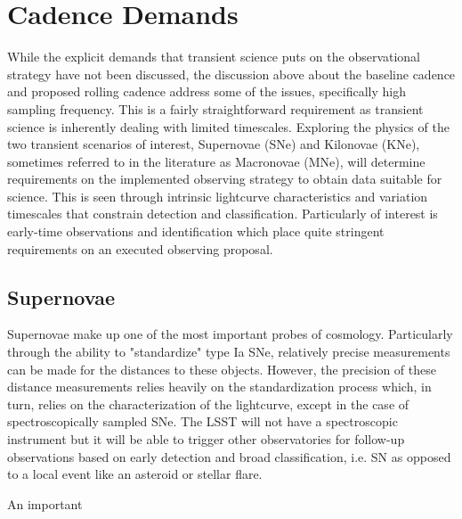 \documentclass[12pt]{article}
\begin{document}
\section{Cadence Demands} %
While the explicit demands that transient science puts on the observational strategy have not been discussed, the discussion above about the baseline cadence and proposed rolling cadence address some of the issues, specifically high sampling frequency. This is a fairly straightforward requirement as transient science is inherently dealing with limited timescales. Exploring the physics of the two transient scenarios of interest, Supernovae (SNe) and Kilonovae (KNe), sometimes referred to in the literature as Macronovae (MNe), will determine requirements on the implemented observing strategy to obtain data suitable for science. This is seen through intrinsic lightcurve characteristics and variation timescales that constrain detection and classification. Particularly of interest is early-time observations and identification which place quite stringent requirements on an executed observing proposal.  \par

\subsection{Supernovae} %
Supernovae make up one of the most important probes of cosmology. Particularly through the ability to "standardize" type Ia SNe, relatively precise measurements can be made for the distances to these objects. However, the precision of these distance measurements relies heavily on the standardization process which, in turn, relies on the characterization of the lightcurve, except in the case of spectroscopically sampled SNe. The LSST will not have a spectroscopic instrument but it will be able to trigger other observatories for follow-up observations based on early detection and broad classification, i.e. SN as opposed to a local event like an asteroid or stellar flare. \par
An important 
\end{document}
